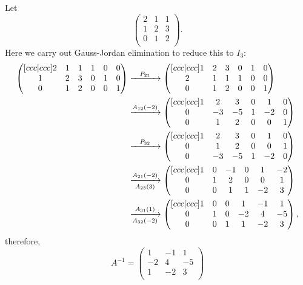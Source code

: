 \begin{example}
    Let
    \[
        \begin{pmatrix}
            2&1&1\\
            1&2&3\\
            0&1&2\\
        \end{pmatrix}
        .
    \]
    Here we carry out Gauss-Jordan elimination to reduce this to $I_3$:
    \begin{align*}
        \begin{pmatrix}[ccc|ccc]
            2&1&1&1&0&0\\
            1&2&3&0&1&0\\
            0&1&2&0&0&1\\
        \end{pmatrix}
        &\eroarrow{P_{21}}{}
        \begin{pmatrix}[ccc|ccc]
            1&2&3&0&1&0\\
            2&1&1&1&0&0\\
            0&1&2&0&0&1\\
        \end{pmatrix}
        \\
        &\eroarrow{A_{12}(-2)}{}
        \begin{pmatrix}[ccc|ccc]
            1&2&3&0&1&0\\
            0&-3&-5&1&-2&0\\
            0&1&2&0&0&1\\
        \end{pmatrix}
        \\
        &\eroarrow{P_{32}}{}
        \begin{pmatrix}[ccc|ccc]
            1&2&3&0&1&0\\
            0&1&2&0&0&1\\
            0&-3&-5&1&-2&0\\
        \end{pmatrix}
        \\
        &\eroarrow{A_{21}(-2)}{A_{23}(3)}
        \begin{pmatrix}[ccc|ccc]
            1&0&-1&0&1&-2\\
            0&1&2&0&0&1\\
            0&0&1&1&-2&3\\
        \end{pmatrix}
        \\
        &\eroarrow{A_{31}(1)}{A_{32}(-2)}
        \begin{pmatrix}[ccc|ccc]
            1&0&0&1&-1&1\\
            0&1&0&-2&4&-5\\
            0&0&1&1&-2&3\\
        \end{pmatrix}
        ,
    \end{align*}
    therefore,
    \[
        A^{-1}=
        \begin{pmatrix}
            1&-1&1\\
            -2&4&-5\\
            1&-2&3\\
        \end{pmatrix}
    \]
\end{example}
